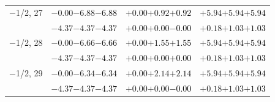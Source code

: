\documentclass[compress]{beamer}
\begin{document}
\begin{frame}
\begin{tabular}{r | c | c | c}
$-$1/2, 27 & $-0.00$\hspace{0.1 cm}$-6.88$\hspace{0.1 cm}\textcolor{black}{$-6.88$} & $+0.00$\hspace{0.1 cm}$+0.92$\hspace{0.1 cm}\textcolor{black}{$+0.92$} & $+5.94$\hspace{0.1 cm}$+5.94$\hspace{0.1 cm}\textcolor{black}{$+5.94$} \\
           & $-4.37$\hspace{0.1 cm}$-4.37$\hspace{0.1 cm}\textcolor{black}{$-4.37$} & $+0.00$\hspace{0.1 cm}$+0.00$\hspace{0.1 cm}\textcolor{black}{$-0.00$} & $+0.18$\hspace{0.1 cm}$+1.03$\hspace{0.1 cm}\textcolor{black}{$+1.03$} \\
$-$1/2, 28 & $-0.00$\hspace{0.1 cm}$-6.66$\hspace{0.1 cm}\textcolor{black}{$-6.66$} & $+0.00$\hspace{0.1 cm}$+1.55$\hspace{0.1 cm}\textcolor{black}{$+1.55$} & $+5.94$\hspace{0.1 cm}$+5.94$\hspace{0.1 cm}\textcolor{black}{$+5.94$} \\
           & $-4.37$\hspace{0.1 cm}$-4.37$\hspace{0.1 cm}\textcolor{black}{$-4.37$} & $+0.00$\hspace{0.1 cm}$+0.00$\hspace{0.1 cm}\textcolor{black}{$+0.00$} & $+0.18$\hspace{0.1 cm}$+1.03$\hspace{0.1 cm}\textcolor{black}{$+1.03$} \\
$-$1/2, 29 & $-0.00$\hspace{0.1 cm}$-6.34$\hspace{0.1 cm}\textcolor{black}{$-6.34$} & $+0.00$\hspace{0.1 cm}$+2.14$\hspace{0.1 cm}\textcolor{black}{$+2.14$} & $+5.94$\hspace{0.1 cm}$+5.94$\hspace{0.1 cm}\textcolor{black}{$+5.94$} \\
           & $-4.37$\hspace{0.1 cm}$-4.37$\hspace{0.1 cm}\textcolor{black}{$-4.37$} & $+0.00$\hspace{0.1 cm}$+0.00$\hspace{0.1 cm}\textcolor{black}{$-0.00$} & $+0.18$\hspace{0.1 cm}$+1.03$\hspace{0.1 cm}\textcolor{black}{$+1.03$} \\

\end{tabular}
\end{frame}
\end{document}
